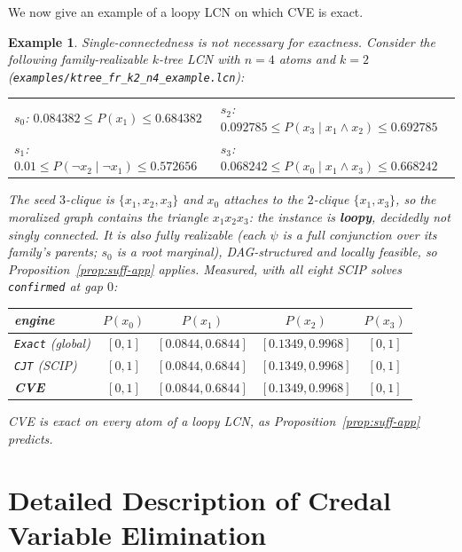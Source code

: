 \documentclass{article} %
\newtheorem{example}{Example}
\begin{document}
We now give an example of a loopy LCN on which CVE is exact.

\begin{example}\label{ex:loopyexact}
Single-connectedness is not necessary for exactness. Consider the following family-realizable $k$-tree LCN with $n{=}4$ atoms and $k{=}2$
(\texttt{examples/ktree\_fr\_k2\_n4\_example.lcn}):
\begin{center}\small
\begin{tabular}{@{}ll@{}}
$s_0$: $0.084382\le P(x_1)\le0.684382$ &
$s_2$: $0.092785\le P(x_3\mid x_1\wedge x_2)\le0.692785$\\
$s_1$: $0.01\le P(\lnot x_2\mid\lnot x_1)\le0.572656$ &
$s_3$: $0.068242\le P(x_0\mid x_1\wedge x_3)\le0.668242$
\end{tabular}
\end{center}
The seed $3$-clique is $\{x_1,x_2,x_3\}$ and $x_0$ attaches to the $2$-clique $\{x_1,x_3\}$, so the
moralized graph contains the triangle $x_1x_2x_3$: the instance is \textbf{loopy}, decidedly not
singly connected. It is also fully realizable (each $\psi$ is a full conjunction over its family's
parents; $s_0$ is a root marginal), DAG-structured and locally feasible, so
Proposition~\ref{prop:suff-app} applies. Measured, with all eight SCIP solves \texttt{confirmed} at
gap $0$:
\begin{center}\small
\begin{tabular}{@{}lcccc@{}}
\toprule
engine & $P(x_0)$ & $P(x_1)$ & $P(x_2)$ & $P(x_3)$ \\
\midrule
\texttt{Exact} (global) & $[0,1]$ & $[0.0844,0.6844]$ & $[0.1349,0.9968]$ & $[0,1]$ \\
\texttt{CJT} (SCIP)           & $[0,1]$ & $[0.0844,0.6844]$ & $[0.1349,0.9968]$ & $[0,1]$ \\
\textbf{CVE}               & $[0,1]$ & $[0.0844,0.6844]$ & $[0.1349,0.9968]$ & $[0,1]$ \\
\bottomrule
\end{tabular}
\end{center}
CVE is \emph{exact on every atom} of a loopy LCN, as Proposition~\ref{prop:suff-app} predicts.
\end{example}




\section{Detailed Description of Credal Variable Elimination}
\label{sec-full-cve}
\end{document}

